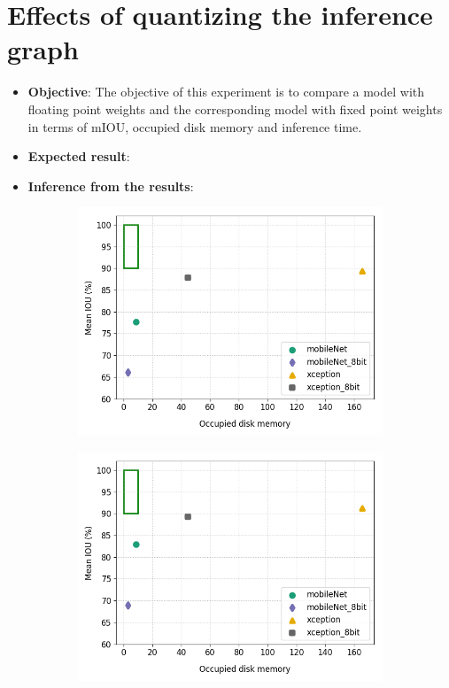 \section{Effects of quantizing the inference graph}
	
	\begin{itemize}
		\item \textbf{Objective}: The objective of this experiment is to compare a model with floating point weights and the corresponding model with fixed point weights in terms of mIOU, occupied disk memory and inference time.
		\item \textbf{Expected result}:
		\item \textbf{Inference from the results}:
	\end{itemize}

	\begin{figure}
		\begin{subfigure}{.5\textwidth}
			\centering
			\includegraphics[width=1\linewidth]{images/q_mem_v_full}
		\end{subfigure}
		\begin{subfigure}{.5\textwidth}
			\centering
			\includegraphics[width=1\linewidth]{images/q_mem_v_size}

\end{subfigure}
\end{figure}
